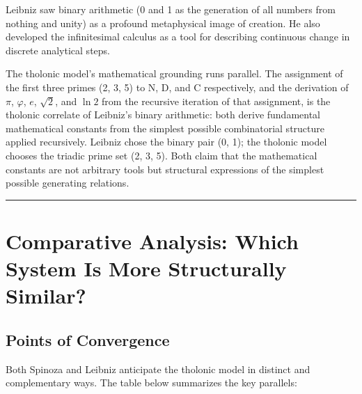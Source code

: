 \documentclass[12pt]{article}
\begin{document}
Leibniz saw binary arithmetic (0 and 1 as the generation of all numbers
from nothing and unity) as a profound metaphysical image of creation. He
also developed the infinitesimal calculus as a tool for describing
continuous change in discrete analytical steps.

The tholonic model's mathematical grounding runs parallel. The
assignment of the first three primes (2, 3, 5) to N, D, and C
respectively, and the derivation of \(\pi\), \(\varphi\), \(e\),
\(\sqrt{2}\), and \(\ln 2\) from the recursive iteration of that
assignment, is the tholonic correlate of Leibniz's binary arithmetic:
both derive fundamental mathematical constants from the simplest
possible combinatorial structure applied recursively. Leibniz chose the
binary pair (0, 1); the tholonic model chooses the triadic prime set (2,
3, 5). Both claim that the mathematical constants are not arbitrary
tools but structural expressions of the simplest possible generating
relations.

\begin{center}\rule{0.5\linewidth}{0.5pt}\end{center}

\section{Comparative Analysis: Which System Is More Structurally Similar?}\label{comparative-analysis-which-system-is-more-structurally-similar}

\subsection{Points of Convergence}\label{points-of-convergence}

Both Spinoza and Leibniz anticipate the tholonic model in distinct and
complementary ways. The table below summarizes the key parallels:
\end{document}
